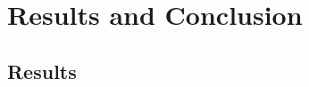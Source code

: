 
\chapter{Results and Conclusion}\doublespacing %

\label{Chapter7} %




\section{Results}





\vspace*{0.5cm}
\vspace*{0.5cm}
